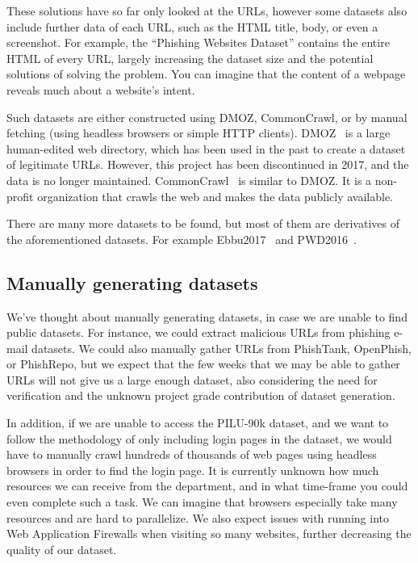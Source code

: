 \documentclass{article}
\begin{document}
    These solutions have so far only looked at the URLs, however some datasets also include further data of each URL, such as the HTML title, body, or even a screenshot.
    For example, the ``Phishing Websites Dataset''\cite{VisualizingRNNInURLDetection} contains the entire HTML of every URL, largely increasing the dataset size and the potential solutions of solving the problem.
    You can imagine that the content of a webpage reveals much about a website's intent.

    Such datasets are either constructed using DMOZ, CommonCrawl, or by manual fetching (using headless browsers\cite{PhishingLoginURLDetection} or simple HTTP clients\cite{}).
    DMOZ~\cite{DMOZ} is a large human-edited web directory, which has been used in the past to create a dataset of legitimate URLs. However, this project has been discontinued in 2017, and the data is no longer maintained.
    CommonCrawl~\cite{CommonCrawl} is similar to DMOZ. It is a non-profit organization that crawls the web and makes the data publicly available.

    There are many more datasets to be found, but most of them are derivatives of the aforementioned datasets.
    For example Ebbu2017~\cite{EBBU2017} and PWD2016~\cite{PWD2016}.

    \subsection{Manually generating datasets}\label{subsec:manually-generating-datasets}

    We've thought about manually generating datasets, in case we are unable to find public datasets.
    For instance, we could extract malicious URLs from phishing e-mail datasets.
    We could also manually gather URLs from PhishTank, OpenPhish, or PhishRepo, but we expect that the few weeks that we may be able to gather URLs will not give us a large enough dataset, also considering the need for verification and the unknown project grade contribution of dataset generation.

    In addition, if we are unable to access the PILU-90k dataset, and we want to follow the methodology of only including login pages in the dataset, we would have to manually crawl hundreds of thousands of web pages using headless browsers in order to find the login page.
    It is currently unknown how much resources we can receive from the department, and in what time-frame you could even complete such a task.
    We can imagine that browsers especially take many resources and are hard to parallelize.
    We also expect issues with running into Web Application Firewalls when visiting so many websites, further decreasing the quality of our dataset.
\end{document}
